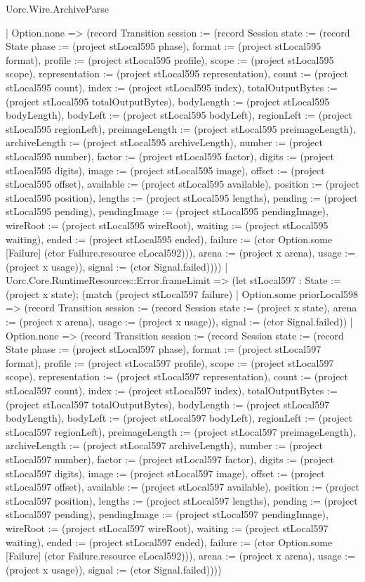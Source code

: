 \begin{lexlean}{Uorc.Wire.ArchiveParse}
\begin{semanticmodule}
{        | Option.none => (record Transition {session := (record Session {state := (record State {phase := (project stLocal595 phase), format := (project stLocal595 format), profile := (project stLocal595 profile), scope := (project stLocal595 scope), representation := (project stLocal595 representation), count := (project stLocal595 count), index := (project stLocal595 index), totalOutputBytes := (project stLocal595 totalOutputBytes), bodyLength := (project stLocal595 bodyLength), bodyLeft := (project stLocal595 bodyLeft), regionLeft := (project stLocal595 regionLeft), preimageLength := (project stLocal595 preimageLength), archiveLength := (project stLocal595 archiveLength), number := (project stLocal595 number), factor := (project stLocal595 factor), digits := (project stLocal595 digits), image := (project stLocal595 image), offset := (project stLocal595 offset), available := (project stLocal595 available), position := (project stLocal595 position), lengths := (project stLocal595 lengths), pending := (project stLocal595 pending), pendingImage := (project stLocal595 pendingImage), wireRoot := (project stLocal595 wireRoot), waiting := (project stLocal595 waiting), ended := (project stLocal595 ended), failure := (ctor Option.some [Failure] (ctor Failure.resource eLocal592))}), arena := (project x arena), usage := (project x usage)}), signal := (ctor Signal.failed)})))
      | Uorc.Core.RuntimeResources::Error.frameLimit => (let stLocal597 : State := (project x state); (match (project stLocal597 failure)
        | Option.some priorLocal598 => (record Transition {session := (record Session {state := (project x state), arena := (project x arena), usage := (project x usage)}), signal := (ctor Signal.failed)})
        | Option.none => (record Transition {session := (record Session {state := (record State {phase := (project stLocal597 phase), format := (project stLocal597 format), profile := (project stLocal597 profile), scope := (project stLocal597 scope), representation := (project stLocal597 representation), count := (project stLocal597 count), index := (project stLocal597 index), totalOutputBytes := (project stLocal597 totalOutputBytes), bodyLength := (project stLocal597 bodyLength), bodyLeft := (project stLocal597 bodyLeft), regionLeft := (project stLocal597 regionLeft), preimageLength := (project stLocal597 preimageLength), archiveLength := (project stLocal597 archiveLength), number := (project stLocal597 number), factor := (project stLocal597 factor), digits := (project stLocal597 digits), image := (project stLocal597 image), offset := (project stLocal597 offset), available := (project stLocal597 available), position := (project stLocal597 position), lengths := (project stLocal597 lengths), pending := (project stLocal597 pending), pendingImage := (project stLocal597 pendingImage), wireRoot := (project stLocal597 wireRoot), waiting := (project stLocal597 waiting), ended := (project stLocal597 ended), failure := (ctor Option.some [Failure] (ctor Failure.resource eLocal592))}), arena := (project x arena), usage := (project x usage)}), signal := (ctor Signal.failed)})))
}
\end{semanticmodule}
\end{lexlean}
